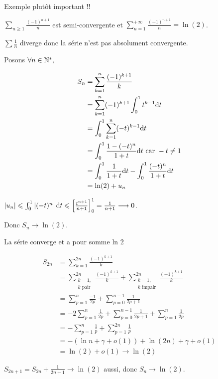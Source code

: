 \begin{exemple}
    Exemple plutôt important !!

    $\displaystyle \sum_{n \geqslant 1 } \frac{(-1)^{n + 1}} n $ est semi-convergente et $\displaystyle \sum_{n = 1 }^{+ \infty} \frac{(-1)^{n + 1}} n = \ln(2)$.

    $\sum \frac 1 n$ diverge donc la série n'est pas absolument convergente. 

    Posons $\forall n \in \mathbb{N}^*, $

    \begin{align*}
        S_n & = \sum_{k = 1}^{n} \frac{(-1)^{k + 1}} k \\
        & = \sum_{k = 1 }^{n } (-1)^{k + 1} \int_0^1 t^{k - 1} \text d t \\
        & = \int_0^1 \sum_{k = 1 }^{n } (-t)^{k - 1} \text d t \\
        & = \int_0^1 \frac{1 - (-t)^n}{1 + t} \text d t \text{ car } -t \neq 1\\
        & = \int_0^1 \frac 1 {1 + t} \text d t - \int_0^1 \frac{(-t)^n}{1 + t} \text d t \\
        & = \ln(2) + u_n
    \end{align*}

    $\left|u_n\right| \leqslant \int_0^1 \left|(-t)^n\right| \text d t \leqslant \left[ \frac{t^{n + 1 }}{n + 1} \right]_0^1 = \frac 1 {n + 1} \longrightarrow 0$.

    Donc $S_n \longrightarrow \ln(2)$.

    La série converge et a pour somme ln 2


    \begin{align*}
        S_{2n} & = \sum_{k = 1}^{2n} \frac{(-1)^{k + 1}} k \\
                & = \sum_{\substack {k = 1, \\ k \text{ pair}}}^{2n} \frac {(-1)^{k + 1}} k + \sum_{\substack{k = 1, \\ k \text{ impair}}}^{2n} \frac {(-1)^{k + 1}} k \\
                & = \sum_{p = 1}^{n} \frac{-1}{2p} + \sum_{p = 0}^{n - 1} \frac{1}{2p + 1} \\
                & = -2 \sum_{p = 1 }^{n } \frac 1 {2p} + \sum_{p = 0}^{n - 1} \frac 1 {2 p + 1} + \sum_{p = 1}^{n} \frac 1 {2p} \\
                & = - \sum_{p = 1 }^{n } \frac 1 p + \sum_{p = 1}^{2n} \frac 1 p \\
                & = - (\ln n + \gamma + o (1)) + \ln (2n) + \gamma + o(1) \\
                & = \ln(2) + o(1) \longrightarrow \ln(2)
    \end{align*}

    $S_{2n + 1} = S_{2n} + \frac{1}{2n + 1} \longrightarrow \ln(2)$ aussi, donc $S_n \longrightarrow \ln(2)$.
\end{exemple}

